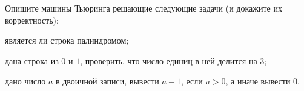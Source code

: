 Опишите машины Тьюринга решающие следующие задачи (и докажите их корректность):
\begin{enumcyr}
    \item является ли строка палиндромом;
    \item дана строка из $0$ и $1$, проверить, что число единиц в ней делится на $3$;
    \item дано число $a$ в двоичной записи, вывести $a - 1$, если $a > 0$, а иначе вывести $0$.
\end{enumcyr}